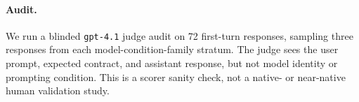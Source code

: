 \paragraph{Audit.}
We run a blinded \texttt{gpt-4.1} judge audit on 72 first-turn responses,
sampling three responses from each model-condition-family stratum. The judge
sees the user prompt, expected contract, and assistant response, but not model
identity or prompting condition. This is a scorer sanity check, not a native- or
near-native human validation study.
